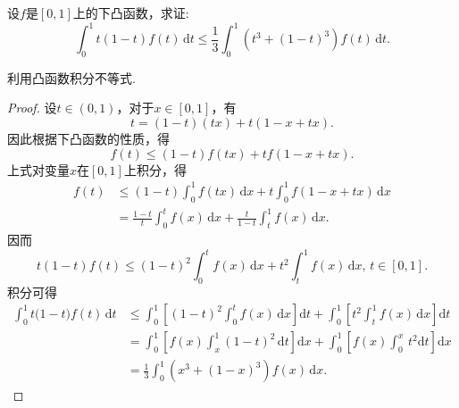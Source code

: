 \documentclass[../../main.tex]{subfiles}%
\begin{document}
\begin{example}
设\( f \)是\([0,1]\)上的下凸函数，求证:
\[
\int_0^1 t(1-t)f(t)\,\text{d}t \leqslant \frac{1}{3}\int_0^1 \left(t^3 + (1-t)^3\right)f(t)\,\text{d}t.
\]
\end{example}
\begin{note}
利用凸函数积分不等式.
\end{note}
\begin{proof}

设\( t \in (0,1) \)，对于\( x \in [0,1] \)，有
\[
t = (1-t)(tx) + t(1 - x + tx).
\]
因此根据下凸函数的性质，得
\[
f(t) \leqslant (1-t)f(tx) + tf(1 - x + tx).
\]
上式对变量\( x \)在\([0,1]\)上积分，得
\begin{align*}
f(t) &\leqslant (1-t)\int_0^1 f(tx)\,\text{d}x + t\int_0^1 f(1 - x + tx)\,\text{d}x \\
&= \frac{1-t}{t} \int_0^t f(x)\,\text{d}x + \frac{t}{1-t}\int_t^1 f(x)\,\text{d}x.
\end{align*}
因而
\[
t(1-t)f(t) \leqslant (1-t)^2\int_0^t f(x)\,\text{d}x + t^2\int_t^1 f(x)\,\text{d}x, \, t \in [0,1].
\]
积分可得
\begin{align*}
\int_0^1{t(1}-t)f(t)\,\mathrm{d}t&\leqslant \int_0^1{\left[ (1-t)^2\int_0^t{f(x)\,\mathrm{d}x} \right] \mathrm{d}t}+\int_0^1{\left[ t^2\int_t^1{f(x)\,\mathrm{d}x} \right] \mathrm{d}t}
\\
&=\int_0^1{\left[ f\left( x \right) \int_x^1{(1-t)^2\,\mathrm{d}t} \right] \mathrm{d}x}+\int_0^1{\left[ f(x)\int_0^x{\,t^2\mathrm{d}t} \right] \mathrm{d}x}
\\
&=\frac{1}{3}\int_0^1{\left( x^3+(1-x)^3 \right) f(x)\,\mathrm{d}x}.
\end{align*}

\end{proof}
\end{document}
